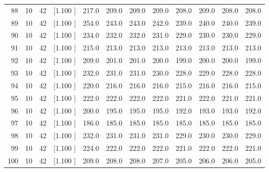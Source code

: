 \documentclass[12pt,a4paper]{article}
\begin{document}
\begin{center}
{\begin{tabular}{r r r r r r r r r r r r}
  88& 10& 42&[1.100     ]&   217.0&   209.0&   209.0&   209.0&   208.0&   209.0&   208.0&   208.0\\[-0.02in]
  89& 10& 42&[1.100     ]&   254.0&   243.0&   243.0&   242.0&   239.0&   240.0&   240.0&   239.0\\[-0.02in]
  90& 10& 42&[1.100     ]&   234.0&   232.0&   232.0&   231.0&   229.0&   230.0&   230.0&   229.0\\[-0.02in]
  91& 10& 42&[1.100     ]&   215.0&   213.0&   213.0&   213.0&   213.0&   213.0&   213.0&   213.0\\[-0.02in]
  92& 10& 42&[1.100     ]&   209.0&   201.0&   201.0&   200.0&   199.0&   200.0&   200.0&   199.0\\[-0.02in]
  93& 10& 42&[1.100     ]&   232.0&   231.0&   231.0&   230.0&   228.0&   229.0&   228.0&   228.0\\[-0.02in]
  94& 10& 42&[1.100     ]&   220.0&   216.0&   216.0&   216.0&   215.0&   216.0&   216.0&   215.0\\[-0.02in]
  95& 10& 42&[1.100     ]&   222.0&   222.0&   222.0&   222.0&   221.0&   222.0&   221.0&   221.0\\[-0.02in]
  96& 10& 42&[1.100     ]&   200.0&   195.0&   195.0&   195.0&   192.0&   193.0&   193.0&   192.0\\[-0.02in]
  97& 10& 42&[1.100     ]&   186.0&   185.0&   185.0&   185.0&   185.0&   185.0&   185.0&   185.0\\[-0.02in]
  98& 10& 42&[1.100     ]&   232.0&   231.0&   231.0&   231.0&   229.0&   230.0&   230.0&   229.0\\[-0.02in]
  99& 10& 42&[1.100     ]&   224.0&   222.0&   222.0&   222.0&   221.0&   222.0&   222.0&   221.0\\[-0.02in]
 100& 10& 42&[1.100     ]&   209.0&   208.0&   208.0&   207.0&   205.0&   206.0&   206.0&   205.0\\[-0.02in]

\hline
\end{tabular}}
\end{center}
\end{document}
